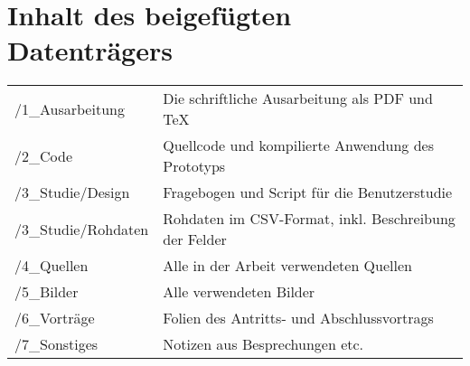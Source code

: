 \documentclass{mi-document/mi-graduation}
\begin{document}
\section*{Inhalt des beigefügten Datenträgers}
\markright{}
\begin{table}[h]
\begin{tabular}{ll}
/1\_Ausarbeitung    & Die schriftliche Ausarbeitung als PDF und TeX         \\
/2\_Code            & Quellcode und kompilierte Anwendung des Prototyps     \\
/3\_Studie/Design   & Fragebogen und Script für die Benutzerstudie          \\
/3\_Studie/Rohdaten & Rohdaten im CSV-Format, inkl. Beschreibung der Felder \\
/4\_Quellen         & Alle in der Arbeit verwendeten Quellen                \\
/5\_Bilder          & Alle verwendeten Bilder                               \\
/6\_Vorträge        & Folien des Antritts- und Abschlussvortrags            \\
/7\_Sonstiges       & Notizen aus Besprechungen etc.                       
\end{tabular}
\end{table}
\end{document}

